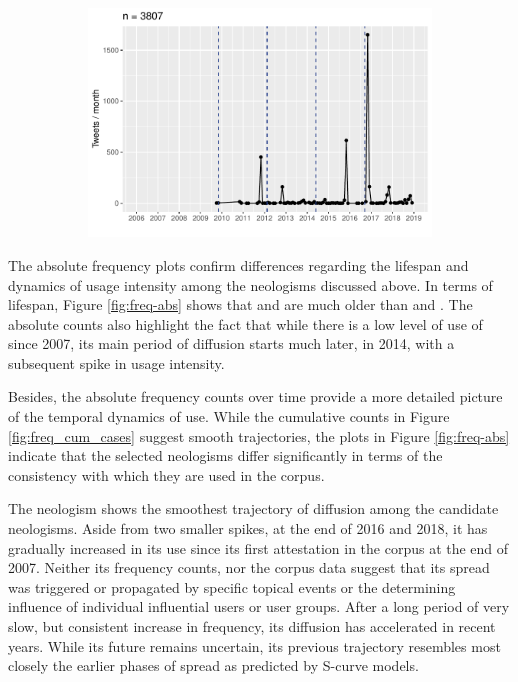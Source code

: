 \documentclass[
  a4paper,
  abstract=on,
  captions=tableabove
  ]{scrartcl}
\begin{document}
\begin{figure}
\begin{subfigure}{.3\linewidth}
          \includegraphics[width=\linewidth, height=.8\textheight, keepaspectratio]{"img/ui_poppygate_time.pdf"}
        \end{subfigure}
      \end{figure}

      The absolute frequency plots confirm differences regarding the lifespan and dynamics of usage intensity among the neologisms discussed above. In terms of lifespan, Figure \ref{fig:freq-abs} shows that  and  are much older than  and . The absolute counts also highlight the fact that while there is a low level of use of  since 2007, its main period of diffusion starts much later, in 2014, with a subsequent spike in usage intensity.


        Besides, the absolute frequency counts over time provide a more detailed picture of the temporal dynamics of use. While the cumulative counts in Figure \ref{fig:freq_cum_cases} suggest smooth trajectories, the plots in Figure \ref{fig:freq-abs} indicate that the selected neologisms differ significantly in terms of the consistency with which they are used in the corpus.

         The neologism  shows the smoothest trajectory of diffusion among the candidate neologisms. Aside from two smaller spikes, at the end of 2016 and 2018, it has gradually increased in its use since its first attestation in the corpus at the end of 2007. Neither its frequency counts, nor the corpus data suggest that its spread was triggered or propagated by specific topical events or the determining influence of individual influential users or user groups. After a long period of very slow, but consistent increase in frequency, its diffusion has accelerated in recent years. While its future remains uncertain, its previous trajectory resembles most closely the earlier phases of spread as predicted by S-curve models.
\end{document}
